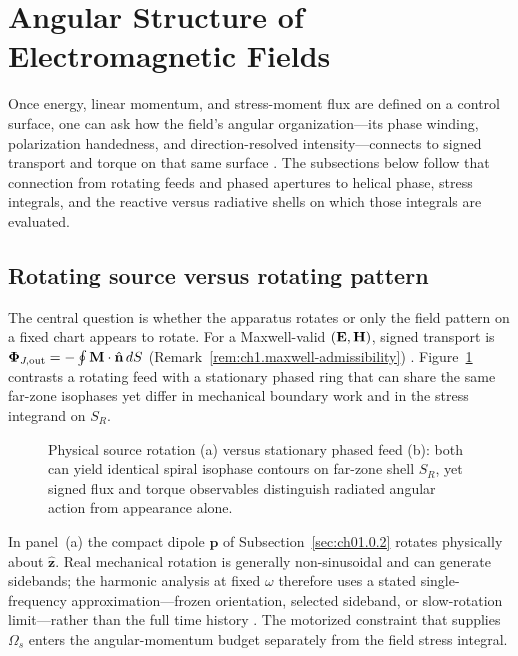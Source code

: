 \section{Angular Structure of Electromagnetic Fields}
\label{sec:ch01.2}

Once energy, linear momentum, and stress-moment flux are defined on a control surface, one can ask how the field's angular organization---its phase winding, polarization handedness, and direction-resolved intensity---connects to signed transport and torque on that same surface \cite{allen1992,stratton1941,beth1936}. The subsections below follow that connection from rotating feeds and phased apertures to helical phase, stress integrals, and the reactive versus radiative shells on which those integrals are evaluated.
\subsection{Rotating source versus rotating pattern}
\label{sec:ch01.2.0}

The central question is whether the apparatus rotates or only the field pattern on a fixed chart appears to rotate. For a Maxwell-valid $(\mathbf{E},\mathbf{H})$, signed transport is $\boldsymbol{\Phi}_{J,\mathrm{out}}=-\oint\mathbf{M}\cdot\hat{\mathbf{n}}\,dS$ (Remark~\ref{rem:ch1.maxwell-admissibility}) \cite{beth1936,stratton1941}. Figure~\ref{fig:ch1.signature-rotation-duality} contrasts a rotating feed with a stationary phased ring that can share the same far-zone isophases yet differ in mechanical boundary work and in the stress integrand on $S_R$.

\begin{figure}[t]
\centering
\VolIPhysFig{\VolIPhysRotationDuality}
\caption{Physical source rotation (a) versus stationary phased feed (b): both can yield identical spiral isophase contours on far-zone shell $S_R$, yet signed flux and torque observables distinguish radiated angular action from appearance alone.}
\label{fig:ch1.signature-rotation-duality}
\end{figure}

In panel~(a) the compact dipole \(\mathbf{p}\) of Subsection~\ref{sec:ch01.0.2} rotates physically about \(\hat{\mathbf{z}}\). Real mechanical rotation is generally non-sinusoidal and can generate sidebands; the harmonic analysis at fixed \(\omega\) therefore uses a stated single-frequency approximation---frozen orientation, selected sideband, or slow-rotation limit---rather than the full time history \cite{stratton1941}. The motorized constraint that supplies \(\Omega_s\) enters the angular-momentum budget separately from the field stress integral.

